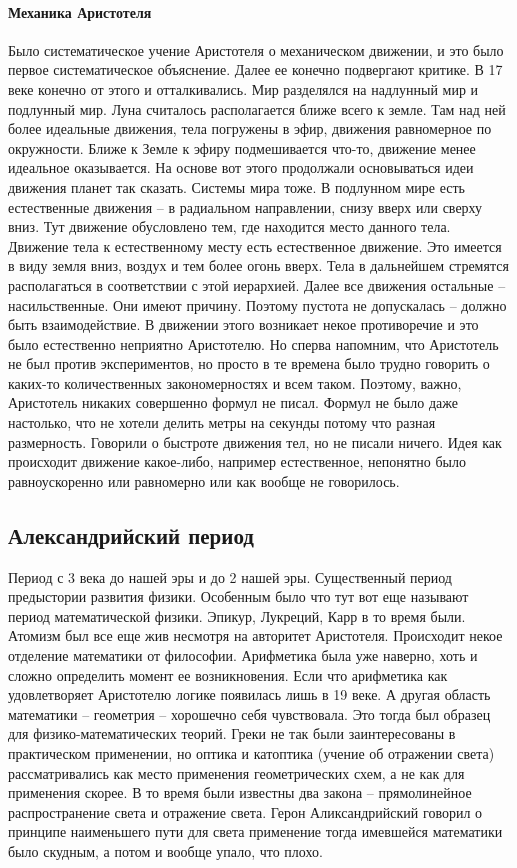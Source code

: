\documentclass[a4paper, 12pt]{article}
\begin{document}
\paragraph{Механика Аристотеля}
Было систематическое учение Аристотеля о механическом движении, и это 
было первое систематическое объяснение. Далее ее конечно подвергают 
критике. В 17 веке конечно от этого и отталкивались. Мир разделялся на 
надлунный мир и подлунный мир. Луна считалось располагается ближе всего 
к земле. Там над ней более идеальные движения, тела погружены в эфир, 
движения равномерное по окружности. Ближе к Земле к эфиру подмешивается 
что-то, движение менее идеальное оказывается. На основе вот этого 
продолжали основываться идеи движения планет так сказать. Системы мира 
тоже. В подлунном мире есть естественные движения -- в радиальном 
направлении, снизу вверх или сверху вниз. Тут движение обусловлено тем, 
где находится место данного тела. Движение тела к естественному месту 
есть естественное движение. Это имеется в виду земля вниз, воздух и тем 
более огонь вверх. Тела в дальнейшем стремятся располагаться 
в соответствии с этой иерархией. Далее все движения остальные -- 
насильственные. Они имеют причину. Поэтому пустота не допускалась -- 
должно быть взаимодействие. В движении этого возникает некое 
противоречие и это было естественно неприятно Аристотелю. Но сперва 
напомним, что Аристотель не был против экспериментов, но просто в те 
времена было трудно говорить о каких-то количественных закономерностях 
и всем таком. Поэтому, важно, Аристотель никаких совершенно формул не 
писал. Формул не было даже настолько, что не хотели делить метры на 
секунды потому что разная размерность. Говорили о быстроте движения тел, 
но не писали ничего. Идея как происходит движение какое-либо, например 
естественное, непонятно было равноускоренно или равномерно или как 
вообще не говорилось.

\subsection{Александрийский период}

Период с 3 века до нашей эры и до 2 нашей эры. Существенный период 
предыстории развития физики. Особенным было что тут вот еще называют 
период математической физики. Эпикур, Лукреций, Карр в то время были. 
Атомизм был все еще жив несмотря на авторитет Аристотеля. Происходит 
некое отделение математики от философии. Арифметика была уже наверно, 
хоть и сложно определить момент ее возникновения. Если что арифметика 
как удовлетворяет Аристотелю логике появилась лишь в 19 веке. А другая 
область математики -- геометрия -- хорошечно себя чувствовала. Это тогда 
был образец для физико-математических теорий. Греки не так были 
заинтересованы в практическом применении, но оптика и катоптика (учение 
об отражении света) рассматривались как место применения геометрических 
схем, а не как для применения скорее. В то время были известны два 
закона -- прямолинейное распространение света и отражение света. Герон 
Аликсандрийский говорил о принципе наименьшего пути для света применение 
тогда имевшейся математики было скудным, а потом и вообще упало, что 
плохо.
\end{document}
